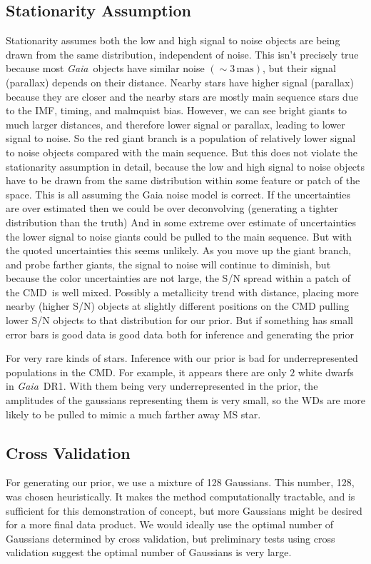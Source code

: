 \documentclass[modern]{aastex61}
\newcommand{\acronym}[1]{{\small{#1}}}
\newcommand{\project}[1]{\textsl{#1}}
\newcommand{\gaia}{\project{Gaia}}
\newcommand{\cmd}{\acronym{CMD}}
\begin{document}
\subsection{Stationarity Assumption}
Stationarity assumes both the low and high signal to noise objects are being drawn from the same distribution, independent of noise. This isn't precisely true because most \gaia\ objects have similar noise $(\sim 3 \, \mathrm{mas})$, but their signal (parallax) depends on their distance. Nearby stars have higher signal (parallax) because they are closer and the nearby stars are mostly main sequence stars due to the IMF, timing, and malmquist bias. However, we can see bright giants to much larger distances, and therefore lower signal or parallax, leading to lower signal to noise. So the red giant branch is a population of relatively lower signal to noise objects compared with the main sequence. But this does not violate the stationarity assumption in detail, because the low and high signal to noise objects have to be drawn from the same distribution within some feature or patch of the space. This is all assuming the Gaia noise model is correct. If the uncertainties are over estimated then we could be over deconvolving (generating a tighter distribution than the truth) And in some extreme over estimate of uncertainties the lower signal to noise giants could be pulled to the main sequence. But with the quoted uncertainties this seems unlikely. As you move up the giant branch, and probe farther giants, the signal to noise will continue to diminish, but because the color uncertainties are not large, the S/N spread within a patch of the \cmd\ is well mixed. Possibly a metallicity trend with distance, placing more nearby (higher S/N) objects at slightly different positions on the CMD pulling lower S/N objects to that distribution for our prior. But if something has small error bars is good data is good data both for inference and generating the prior

For very rare kinds of stars. Inference with our prior is bad for underrepresented populations in the \cmd. For example, it appears there are only $2$ white dwarfs in \gaia\ DR1. With them being very underrepresented in the prior, the amplitudes of the gaussians representing them is very small, so the WDs are more likely to be pulled to mimic a much farther away MS star.

\subsection{Cross Validation}
For generating our prior, we use a mixture of 128 Gaussians. This number, 128, was chosen heuristically. It makes the method computationally tractable, and is sufficient for this demonstration of concept, but more Gaussians might be desired for a more final data product. We would ideally use the optimal number of Gaussians determined by cross validation, but preliminary tests using cross validation suggest the optimal number of Gaussians is very large.
\end{document}
